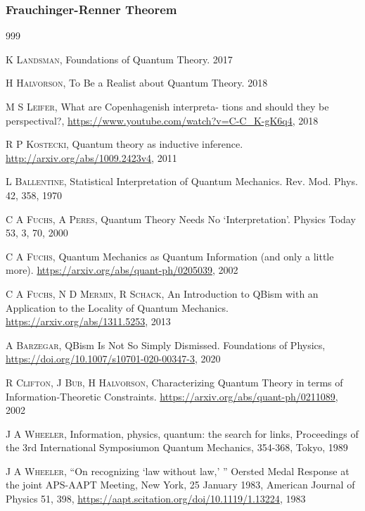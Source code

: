 \documentclass[11pt]{report}
\renewenvironment{thebibliography}[1]{\begin{oldthebibliography}{#1}\setlength{\itemsep}{0.45em}\setlength{\parskip}{0em}}{\end{oldthebibliography}}
\begin{document}
\subsubsection{{Frauchinger-Renner Theorem}}
	
{}
\begin{thebibliography}{999}
		\begin{small}			
		\textsc{K Landsman,}
		{Foundations of Quantum Theory}.
		2017

		\textsc{H Halvorson,}
		{To Be a Realist about Quantum Theory}.
		2018
		
		\textsc{M S Leifer},
		{What are Copenhagenish interpreta- tions and should they be perspectival?,}
		\url{https://www.youtube.com/watch?v=C-C_K-gK6q4}, 2018
		
		\textsc{R P Kostecki,}
		{Quantum theory as inductive inference}.
		\url{http://arxiv.org/abs/1009.2423v4}, 2011
		
		\textsc{L Ballentine,}
		{Statistical Interpretation of Quantum Mechanics}.
		Rev. Mod. Phys. 42, 358, 1970
		
		\textsc{C A Fuchs, A Peres,}
		{Quantum Theory Needs No `Interpretation'}.
		Physics Today 53, 3, 70, 2000
		
		\textsc{C A Fuchs,}
		{Quantum Mechanics as Quantum Information (and only a little more)}.
		\url{https://arxiv.org/abs/quant-ph/0205039}, 2002
		
		\textsc{C A Fuchs, N D Mermin, R Schack,}
		{An Introduction to QBism with an Application to the Locality of Quantum Mechanics}.
		\url{https://arxiv.org/abs/1311.5253}, 2013
		
		\textsc{A Barzegar},
		{QBism Is Not So Simply Dismissed}.
		Foundations of Physics, \url{https://doi.org/10.1007/s10701-020-00347-3}, 2020
		
		\textsc{R Clifton, J Bub, H Halvorson,}
		{Characterizing Quantum Theory in terms of Information-Theoretic Constraints}.
		\url{https://arxiv.org/abs/quant-ph/0211089}, 2002
		
		\textsc{J A Wheeler,}
		{Information, physics, quantum: the search for links,}
		Proceedings of the 3rd International Symposiumon Quantum Mechanics, 354-368, Tokyo, 1989
		
		\textsc{J A Wheeler,}
		{``On recognizing `law without law,' '' Oersted Medal Response at the joint APS-AAPT Meeting, New York, 25 January 1983,}
		American Journal of Physics 51, 398, \url{https://aapt.scitation.org/doi/10.1119/1.13224}, 1983
		

\end{small}
\end{thebibliography}
\end{document}
